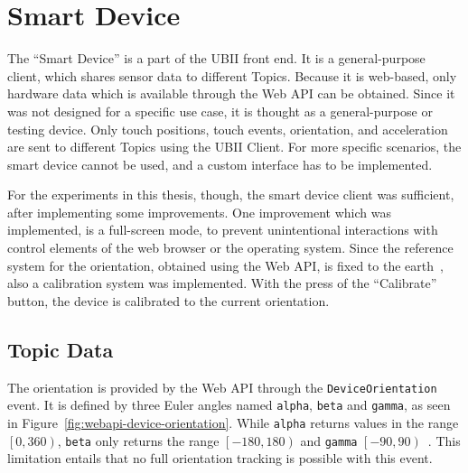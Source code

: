 \section{Smart Device}\label{section:smart-device}

The \enquote{Smart Device} is a part of the \ac{UBII} front end. It is a general-purpose client, which shares sensor data to different Topics. Because it is web-based, only hardware data which is available through the Web \ac{API} can be obtained. Since it was not designed for a specific use case, it is thought as a general-purpose or testing device. Only touch positions, touch events, orientation, and acceleration are sent to different Topics using the \ac{UBII} Client. For more specific scenarios, the smart device cannot be used, and a custom interface has to be implemented.

For the experiments in this thesis, though, the smart device client was sufficient, after implementing some improvements. One improvement which was implemented, is a full-screen mode, to prevent unintentional interactions with control elements of the web browser or the operating system. Since the reference system for the orientation, obtained using the Web \ac{API}, is fixed to the earth~\cite[Chapter~4.1]{DevicesandSensorsWorkingGroup.2019}, also a calibration system was implemented. With the press of the \enquote{Calibrate} button, the device is calibrated to the current orientation.


\subsection{Topic Data}\label{subsection:topic-data}

The orientation is provided by the Web \ac{API} through the \lstinline{DeviceOrientation} event. It is defined by three Euler angles named \lstinline{alpha}, \lstinline{beta} and \lstinline{gamma}, as seen in Figure~\ref{fig:webapi-device-orientation}.
While \lstinline{alpha} returns values in the range \(\left[0, 360\right)\), \lstinline{beta} only returns the range \(\left[-180, 180\right)\) and \lstinline{gamma} \(\left[-90, 90\right)\)~\cite[Chapter~4.1]{DevicesandSensorsWorkingGroup.2019}. %
This limitation entails that no full orientation tracking is possible with this event.


